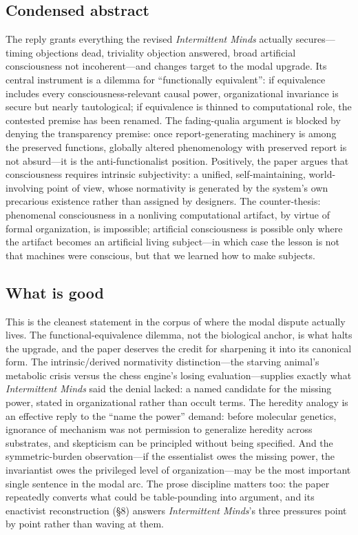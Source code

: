 \documentclass[11pt]{article}
\newcommand{\IM}{\emph{Intermittent Minds}}
\begin{document}
\subsection{Condensed abstract}
The reply grants everything the revised \IM{} actually secures---timing objections dead, triviality objection answered, broad artificial consciousness not incoherent---and changes target to the modal upgrade. Its central instrument is a dilemma for ``functionally equivalent'': if equivalence includes every consciousness-relevant causal power, organizational invariance is secure but nearly tautological; if equivalence is thinned to computational role, the contested premise has been renamed. The fading-qualia argument is blocked by denying the transparency premise: once report-generating machinery is among the preserved functions, globally altered phenomenology with preserved report is not absurd---it is the anti-functionalist position. Positively, the paper argues that consciousness requires intrinsic subjectivity: a unified, self-maintaining, world-involving point of view, whose normativity is generated by the system's own precarious existence rather than assigned by designers. The counter-thesis: phenomenal consciousness in a nonliving computational artifact, by virtue of formal organization, is impossible; artificial consciousness is possible only where the artifact becomes an artificial living subject---in which case the lesson is not that machines were conscious, but that we learned how to make subjects.

\subsection{What is good}
This is the cleanest statement in the corpus of where the modal dispute actually lives. The functional-equivalence dilemma, not the biological anchor, is what halts the upgrade, and the paper deserves the credit for sharpening it into its canonical form. The intrinsic/derived normativity distinction---the starving animal's metabolic crisis versus the chess engine's losing evaluation---supplies exactly what \IM{} said the denial lacked: a named candidate for the missing power, stated in organizational rather than occult terms. The heredity analogy is an effective reply to the ``name the power'' demand: before molecular genetics, ignorance of mechanism was not permission to generalize heredity across substrates, and skepticism can be principled without being specified. And the symmetric-burden observation---if the essentialist owes the missing power, the invariantist owes the privileged level of organization---may be the most important single sentence in the modal arc. The prose discipline matters too: the paper repeatedly converts what could be table-pounding into argument, and its enactivist reconstruction (\S 8) answers \IM{}'s three pressures point by point rather than waving at them.
\end{document}
